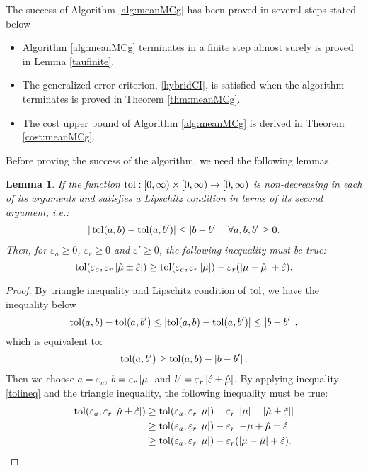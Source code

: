 \documentclass{iitthesis}
\newtheorem{lemma}[theorem]{Lemma}
\theoremstyle{definition}
\begin{document}
The success of Algorithm \ref{alg:meanMCg} has been proved in several steps stated below
\begin{itemize}
\item Algorithm \ref{alg:meanMCg} terminates in a finite step almost surely is proved in Lemma \ref{taufinite}.
\item The generalized error criterion, \eqref{hybridCI}, is satisfied when the algorithm terminates is proved in Theorem \ref{thm:meanMCg}.
\item The cost upper bound of Algorithm \ref{alg:meanMCg} is derived in Theorem \ref{cost:meanMCg}.
\end{itemize}
Before proving the success of the algorithm, we need the following lemmas.

\begin{lemma}\label{cost1}
If the function $\operatorname{tol}: [0, \infty) \times [0, \infty) \to [0,\infty)$ is non-decreasing in each of its arguments and satisfies a Lipschitz condition in terms of its second argument, i.e.:
\begin{align}
|\operatorname{tol} (a,b)-\operatorname{tol} (a,b')| \leq |b-b'| \quad \forall a,b,b' \geq 0.
\end{align}
Then, for $\varepsilon_a \geq 0$, $\varepsilon_r\geq 0$ and $\varepsilon' \geq 0$, the following inequality must be true:
\begin{equation}\label{lipstol}
\operatorname{tol} (\varepsilon_a, \varepsilon_r \left \lvert \hat{\mu} \pm\hat{\varepsilon}  \right \rvert) \geq \operatorname{tol}(\varepsilon_a,\varepsilon_r \left \lvert \mu \right \rvert)-\varepsilon_r (\left \lvert \mu-\hat{\mu} \right \rvert + \hat{\varepsilon}).
\end{equation}
\end{lemma}
\begin{proof}
By triangle inequality and Lipschitz condition of $\operatorname{tol}$, we have the inequality below
 $$\operatorname{tol}(a,b) -\operatorname{tol}(a,b') \leq \left \lvert \operatorname{tol}(a,b) -\operatorname{tol}(a,b') \right \rvert \leq \left \lvert b-b' \right \rvert,$$
which is equivalent to:
\begin{align}\label{tolineq}
\operatorname{tol}(a,b') \geq \operatorname{tol}(a,b)-\left \lvert b-b' \right \rvert.
\end{align}
Then we choose $a = \varepsilon_a$, $b =\varepsilon_r\left \lvert \mu \right \rvert$ and $b'=\varepsilon_r\left \lvert \hat{\varepsilon} \pm \hat{\mu} \right \rvert$. By applying inequality \eqref{tolineq} and the triangle inequality, the following inequality must be true:
\begin{align*}
\operatorname{tol} (\varepsilon_a, \varepsilon_r \left \lvert \hat{\mu} \pm\hat{\varepsilon} \right \rvert) &
 \geq \operatorname{tol}(\varepsilon_a,\varepsilon_r \left \lvert \mu \right \rvert)-\varepsilon_r \left \lvert \left \lvert \mu \right \rvert-\left \lvert \hat{\mu}  \pm \hat{\varepsilon} \right \rvert \right \rvert \\&\geq \operatorname{tol}(\varepsilon_a,\varepsilon_r \left \lvert \mu \right \rvert)-\varepsilon_r \left \lvert -\mu+\hat{\mu} \pm \hat{\varepsilon} \right \rvert \\&
 \geq \operatorname{tol}(\varepsilon_a,\varepsilon_r \left \lvert \mu \right \rvert)-\varepsilon_r (\left \lvert \mu-\hat{\mu} \right \rvert + \hat{\varepsilon}).
\end{align*}
\end{proof}
\end{document}
